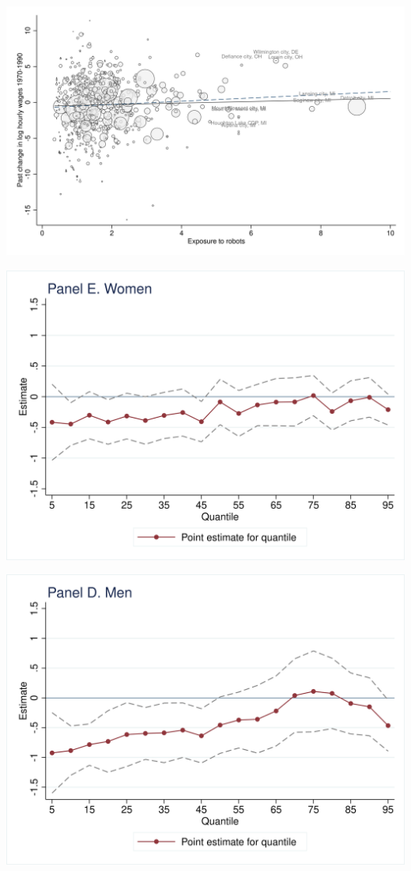\documentclass{article}
\begin{document}
\begin{center}\includegraphics[scale=0.15]{output/figure_placebo_hrwage.png}\end{center}
\begin{center}\includegraphics[scale=0.15]{output/figure_quantile_all_f.png}\end{center}
\begin{center}\includegraphics[scale=0.15]{output/figure_quantile_all_m.png}\end{center}
\end{document}
